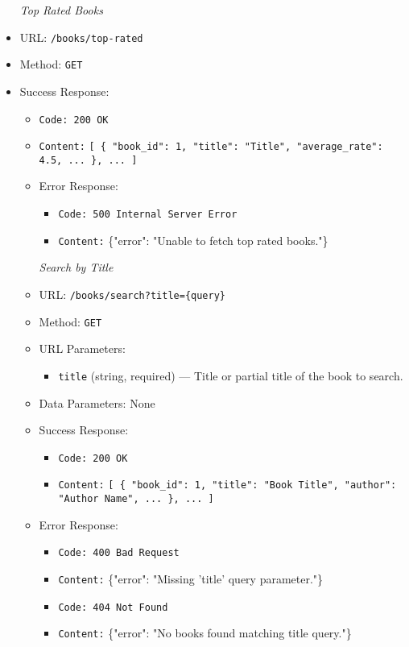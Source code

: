 \begin{itemize}
\begin{itemize}
\begin{itemize}
\item[\textit{Top Rated Books}] 
\item URL: \texttt{/books/top-rated}  
\item Method: \texttt{GET} 
\item Success Response:
\begin{itemize}
  \item \texttt{Code: 200 OK}  
  \item \texttt{Content:} \texttt{[ \{ "book\_id": 1, "title": "Title", "average\_rate": 4.5, ... \}, ... ]}
  \item Error Response:
\begin{itemize}
  \item \texttt{Code: 500 Internal Server Error}  
  \item \texttt{Content:} \{"error": "Unable to fetch top rated books."\}
\end{itemize}

\item[\textit{Search by Title}]
\item URL: \texttt{/books/search?title=\{query\}}  
\item Method: \texttt{GET}  
\item URL Parameters:
\begin{itemize}
  \item \texttt{title} (string, required) — Title or partial title of the book to search.
\end{itemize}
\item Data Parameters: None  
\item Success Response:
\begin{itemize}
  \item \texttt{Code: 200 OK}  
  \item \texttt{Content:} \texttt{[ \{ "book\_id": 1, "title": "Book Title", "author": "Author Name", ... \}, ... ]}
\end{itemize}
\item Error Response:
\begin{itemize}
  \item \texttt{Code: 400 Bad Request}  
  \item \texttt{Content:} \{"error": "Missing 'title' query parameter."\}
  \item \texttt{Code: 404 Not Found}  
  \item \texttt{Content:} \{"error": "No books found matching title query."\}
\end{itemize}


\end{itemize}
\end{itemize}
\end{itemize}
\end{itemize}
